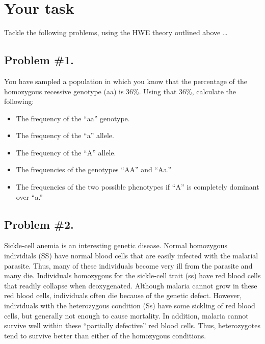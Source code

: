 \documentclass[
  a4paper]{book}
\providecommand{\tightlist}{%
  \setlength{\itemsep}{0pt}\setlength{\parskip}{0pt}}
\begin{document}
\hypertarget{your-task-9}{%
\section{Your task}\label{your-task-9}}

Tackle the following problems, using the HWE theory outlined above \ldots{}

\hypertarget{problem-1.}{%
\subsection{Problem \#1.}\label{problem-1.}}

You have sampled a population in which you know that the percentage of the homozygous recessive genotype (aa) is 36\%. Using that 36\%, calculate the following:

\begin{itemize}
\tightlist
\item
  The frequency of the ``aa'' genotype.
\item
  The frequency of the ``a'' allele.
\item
  The frequency of the ``A'' allele.
\item
  The frequencies of the genotypes ``AA'' and ``Aa.''
\item
  The frequencies of the two possible phenotypes if ``A'' is completely dominant over ``a.''
\end{itemize}

\hypertarget{problem-2.}{%
\subsection{Problem \#2.}\label{problem-2.}}

Sickle-cell anemia is an interesting genetic disease. Normal homozygous individials (SS) have normal blood cells that are easily infected with the malarial parasite. Thus, many of these individuals become very ill from the parasite and many die. Individuals homozygous for the sickle-cell trait (ss) have red blood cells that readily collapse when deoxygenated. Although malaria cannot grow in these red blood cells, individuals often die because of the genetic defect. However, individuals with the heterozygous condition (Ss) have some sickling of red blood cells, but generally not enough to cause mortality. In addition, malaria cannot survive well within these ``partially defective'' red blood cells. Thus, heterozygotes tend to survive better than either of the homozygous conditions.
\end{document}
